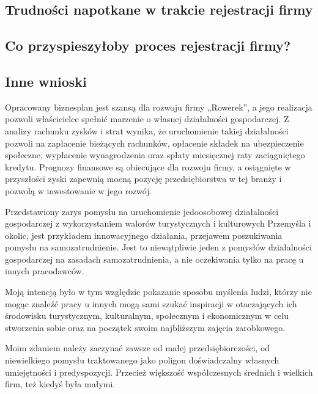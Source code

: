 \documentclass{sprawozdanie-agh}
\begin{document}
		\subsection{Trudności napotkane w trakcie rejestracji firmy}
		\subsection{Co przyspieszyłoby proces rejestracji firmy?}
		\subsection{Inne wnioski}
		
		Opracowany biznesplan jest szansą dla rozwoju firmy „Rowerek”, a jego realizacja pozwoli właścicielce spełnić marzenie o własnej działalności gospodarczej. Z analizy rachunku zysków i strat wynika, że uruchomienie takiej działalności pozwoli na zapłacenie bieżących rachunków, opłacenie składek na ubezpieczenie społeczne, wypłacenie wynagrodzenia oraz spłaty miesięcznej raty zaciągniętego kredytu. Prognozy finansowe są obiecujące dla rozwoju firmy, a osiągnięte w przyszłości zyski zapewnią mocną pozycję przedsiębiorstwa w tej branży i pozwolą w inwestowanie w jego rozwój.
		
		Przedstawiony zarys pomysłu na uruchomienie jedoosobowej działalności gospodarczej z wykorzystaniem walorów turystycznych i kulturowych Przemyśla i okolic, jest przykładem innowacyjnego działania, przejawem poszukiwania pomysłu na samozatrudnienie. Jest to niewątpliwie jeden z pomysłów działalności gospodarczej na zasadach samozatrudnienia, a nie oczekiwania tylko na pracę u innych pracodawców.
		
		Moją intencją było w tym względzie pokazanie sposobu myślenia ludzi, którzy nie mogąc  znaleźć pracy u innych mogą sami szukać inspiracji w otaczających ich środowisku turystycznym, kulturalnym, społecznym i ekonomicznym w celu stworzenia sobie oraz na początek swoim najbliższym zajęcia zarobkowego.
		
		Moim zdaniem należy zaczynać zawsze od małej przedsiębiorczości, od niewielkiego pomysłu traktowanego jako poligon doświadczalny własnych umiejętności i predyspozycji. Przecież większość współczesnych średnich i wielkich firm, też kiedyś była małymi.
\end{document}

